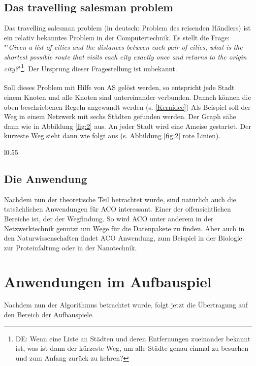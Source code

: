 \documentclass[12pt]{article}
\begin{document}
\subsection[TSP]{Das travelling salesman problem}\label{TSP}
Das travelling salesman problem (in deutsch: Problem des reisenden Händlers) ist ein relativ bekanntes Problem 
in der Computertechnik. Es stellt die Frage:
"'\textit{Given a list of cities and the distances between each pair of cities, what is the shortest possible route that visits each city exactly once and returns to the origin city?}"\cite{wiki_TSP}\footnote{DE: Wenn eine Liste an Städten und deren Entfernungen zueinander bekannt ist, was ist dann der kürzeste Weg, um alle Städte genau einmal zu besuchen und zum Anfang zurück zu kehren?}. Der Ursprung dieser Fragestellung ist unbekannt.\\\\
Soll dieses Problem mit Hilfe von AS gelöst werden, so entspricht jede Stadt einem Knoten und alle Knoten sind untereinander verbunden. Danach können die oben beschriebenen Regeln angewandt werden (s. \ref{Kernidee})
Als Beispiel soll der Weg in einem Netzwerk mit sechs Städten gefunden werden. Der Graph sähe dann wie in Abbildung \ref{fig:2} aus. An jeder Stadt wird eine Ameise gestartet. Der kürzeste Weg \cite{aco-sim} sieht dann wie folgt aus (s. Abbildung \ref{fig:2} rote Linien).
\begin{wrapfigure}[13]{l}{0.55\textwidth}
\centering
{}
\caption{Netzwerk an Städten}
\label{fig:2}
\end{wrapfigure}
\subsection{Die Anwendung}
Nachdem nun der theoretische Teil betrachtet wurde, sind natürlich auch die tatsächlichen Anwendungen für ACO interessant. Einer der offensichtlichen Bereiche ist, der der Wegfindung. So wird ACO unter anderem in der Netzwerktechnik genutzt um Wege für die Datenpakete zu finden. Aber auch in den Naturwissenschaften findet ACO Anwendung, zum Beispiel in der Biologie zur Proteinfaltung oder in der Nanotechnik. 
\section{Anwendungen im Aufbauspiel}
Nachdem nun der Algorithmus betrachtet wurde, folgt jetzt die Übertragung auf den Bereich der Aufbauspiele.
\end{document}
